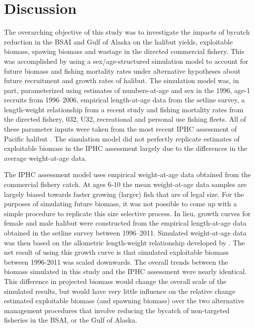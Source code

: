 
\section{Discussion} %
\label{sec:discussion}

The overarching objective of this study was to investigate the impacts of bycatch reduction in the BSAI and Gulf of Alaska on the halibut yields, exploitable biomass, spawing biomass and wastage in the directed commercial fishery.  This was accomplished by using a sex/age-structured simulation model to account for future biomass and fishing mortality rates under alternative hypotheses about future recruitment and growth rates of halibut.  The simulation model was, in part, parameterized using estimates of numbers-at-age and sex in the 1996, age-1 recruits from 1996--2006, empirical length-at-age data from the setline survey, a length-weight relationship from a recent study and fishing mortality rates from the directed fishery, 032, U32, recreational and personal use fishing fleets.  All of these parameter inputs were taken from the most recent IPHC assessment of Pacific halibut \citep[see][wobblesq model]{Hare2012Rara}.  The simulation model did not perfectly replicate estimates of exploitable biomass in the IPHC assessment largely due to the differences in the average weight-at-age data.  


The IPHC assessment model uses empirical weight-at-age data obtained from the commercial fishery catch.  At ages 6-10 the mean weight-at-age data samples are largely biased towards faster growing (larger) fish that are of legal size.  For the purposes of simulating future biomass, it was not possible to come up with a simple procedure to replicate this size selective process.  In lieu, growth curves for female and male halibut were constructed from the empirical length-at-age data obtained in the setline survey between 1996--2011.  Simulated weight-at-age data was then based on the allometric length-weight relationship developed by \cite{courcellesre}.  The net result of using this growth curve is that simulated exploitable biomass between 1996-2011 was scaled downwards.  The overall trends between the biomass simulated in this study and the IPHC assessment were nearly identical.  This difference in projected biomass would change the overall scale of the simulated results, but would have very little influence on the relative change estimated exploitable biomass (and spawning biomass) over the two alternative management procedures that involve reducing the bycatch of non-targeted fisheries in the BSAI, or the Gulf of Alaska.


